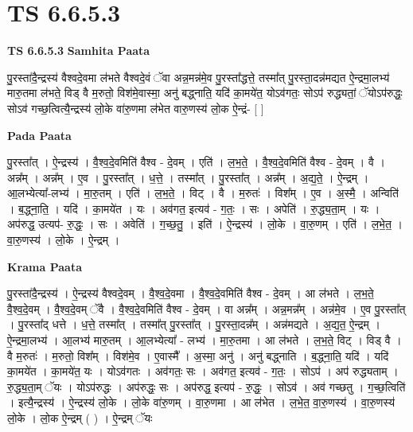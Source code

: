 \documentclass[17pt]{extarticle}
\begin{document}
\section{ TS 6.6.5.3 }

\textbf{TS 6.6.5.3 } \newline
\textbf{Samhita Paata} \newline

पु॒रस्ता॑दै॒न्द्रस्य॑ वैश्वदे॒वमा ल॑भते वैश्वदे॒वं ॅवा अन्न॒मन्न॑मे॒व पु॒रस्ता᳚द्धत्ते॒ तस्मा᳚त् पु॒रस्ता॒दन्न॑मद्यत ऐ॒न्द्रमा॒लभ्य॑ मारु॒तमा ल॑भते॒ विड् वै म॒रुतो॒ विश॑मे॒वास्मा॒ अनु॑ बद्ध्नाति॒ यदि॑ का॒मये॑त॒ योऽव॑गतः॒ सोऽप॑ रुद्ध्यतां॒ ॅयोऽप॑रुद्धः॒ सोऽव॑ गच्छ॒त्वित्यै॒न्द्रस्य॑ लो॒के वा॑रु॒णमा ल॑भेत वारु॒णस्य॑ लो॒क ऐ॒न्द्रं- [  ] \newline

\textbf{Pada Paata} \newline

पु॒रस्ता᳚त् । ऐ॒न्द्रस्य॑ । वै॒श्व॒दे॒वमिति॑ वैश्व - दे॒वम् । एति॑ । ल॒भ॒ते॒ । वै॒श्व॒दे॒वमिति॑ वैश्व - दे॒वम् । वै । अन्न᳚म् । अन्न᳚म् । ए॒व । पु॒रस्ता᳚त् । ध॒त्ते॒ । तस्मा᳚त् । पु॒रस्ता᳚त् । अन्न᳚म् । अ॒द्य॒ते॒ । ऐ॒न्द्रम् । आ॒लभ्येत्या᳚-लभ्य॑ । मा॒रु॒तम् । एति॑ । ल॒भ॒ते॒ । विट् । वै । म॒रुतः॑ । विश᳚म् । ए॒व । अ॒स्मै॒ । अन्विति॑ । ब॒द्ध्ना॒ति॒ । यदि॑ । का॒मये॑त । यः । अव॑गत॒ इत्यव॑ - ग॒तः॒ । सः । अपेति॑ । रु॒द्ध्य॒ता॒म् । यः । अप॑रुद्ध॒ उत्यप॑- रु॒द्धः॒ । सः । अवेति॑ । ग॒च्छ॒तु॒ । इति॑ । ऐ॒न्द्रस्य॑ । लो॒के । वा॒रु॒णम् । एति॑ । ल॒भे॒त॒ । वा॒रु॒णस्य॑ । लो॒के । ऐ॒न्द्रम् ।  \newline


\textbf{Krama Paata} \newline

पु॒रस्ता॑दै॒न्द्रस्य॑ । ऐ॒न्द्रस्य॑ वैश्वदे॒वम् । वै॒श्व॒दे॒वमा । वै॒श्व॒दे॒वमिति॑ वैश्व - दे॒वम् । आ ल॑भते । ल॒भ॒ते॒ वै॒श्व॒दे॒वम् । वै॒श्व॒दे॒वम् ॅवै । वै॒श्व॒दे॒वमिति॑ वैश्व - दे॒वम् । वा अन्न᳚म् । अन्न॒मन्न᳚म् । अन्न॑मे॒व । ए॒व पु॒रस्ता᳚त् । पु॒रस्ता᳚द् धत्ते । ध॒त्ते॒ तस्मा᳚त् । तस्मा᳚त् पु॒रस्ता᳚त् । पु॒रस्ता॒दन्न᳚म् । अन्न॑मद्यते । अ॒द्य॒त॒ ऐ॒न्द्रम् । ऐ॒न्द्रमा॒लभ्य॑ । आ॒लभ्य॑ मारु॒तम् । आ॒लभ्येत्या᳚ - लभ्य॑ । मा॒रु॒तमा । आ ल॑भते । ल॒भ॒ते॒ विट् । विड् वै । वै म॒रुतः॑ । म॒रुतो॒ विश᳚म् । विश॑मे॒व । ए॒वास्मै᳚ । अ॒स्मा॒ अनु॑ । अनु॑ बद्ध्नाति । ब॒द्ध्ना॒ति॒ यदि॑ । यदि॑ का॒मये॑त । का॒मये॑त॒ यः । योऽव॑गतः । अव॑गतः॒ सः । अव॑गत॒ इत्यव॑ - ग॒तः॒ । सोऽप॑ । अप॑ रुद्ध्यताम् । रु॒द्ध्य॒ता॒म् ॅयः । योऽप॑रुद्धः । अप॑रुद्धः॒ सः । अप॑रुद्ध॒ इत्यप॑ - रु॒द्धः॒ । सोऽव॑ । अव॑ गच्छतु । ग॒च्छ॒त्विति॑ । इत्यै॒न्द्रस्य॑ । ऐ॒न्द्रस्य॑ लो॒के । लो॒के वा॑रु॒णम् । वा॒रु॒णमा । आ ल॑भेत । ल॒भे॒त॒ वा॒रु॒णस्य॑ । वा॒रु॒णस्य॑ लो॒के । लो॒क ऐ॒न्द्रम् ( ) । ऐ॒न्द्रम् ॅयः \newline
\end{document}
